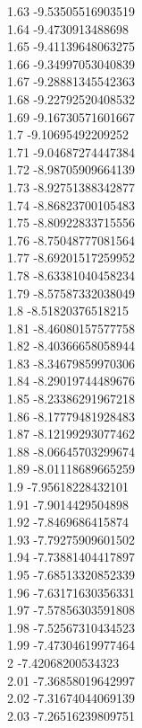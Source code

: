 {1.63	-9.53505516903519\\
1.64	-9.4730913488698\\
1.65	-9.41139648063275\\
1.66	-9.34997053040839\\
1.67	-9.28881345542363\\
1.68	-9.22792520408532\\
1.69	-9.16730571601667\\
1.7	-9.10695492209252\\
1.71	-9.04687274447384\\
1.72	-8.98705909664139\\
1.73	-8.92751388342877\\
1.74	-8.86823700105483\\
1.75	-8.80922833715556\\
1.76	-8.75048777081564\\
1.77	-8.69201517259952\\
1.78	-8.63381040458234\\
1.79	-8.57587332038049\\
1.8	-8.51820376518215\\
1.81	-8.46080157577758\\
1.82	-8.40366658058944\\
1.83	-8.34679859970306\\
1.84	-8.29019744489676\\
1.85	-8.23386291967218\\
1.86	-8.17779481928483\\
1.87	-8.12199293077462\\
1.88	-8.06645703299674\\
1.89	-8.01118689665259\\
1.9	-7.95618228432101\\
1.91	-7.9014429504898\\
1.92	-7.8469686415874\\
1.93	-7.79275909601502\\
1.94	-7.73881404417897\\
1.95	-7.68513320852339\\
1.96	-7.63171630356331\\
1.97	-7.57856303591808\\
1.98	-7.52567310434523\\
1.99	-7.47304619977464\\
2	-7.42068200534323\\
2.01	-7.36858019642997\\
2.02	-7.31674044069139\\
2.03	-7.26516239809751\\
}
